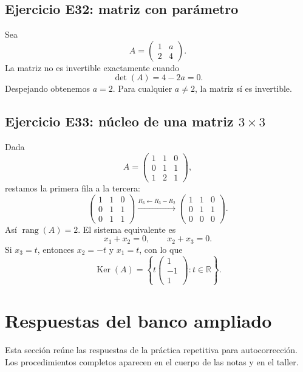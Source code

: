 \documentclass[12pt]{article}
\theoremstyle{remark}
\newcommand{\R}{\mathbb{R}}
\newcommand{\rang}{\operatorname{rang}}
\newcommand{\Ker}{\operatorname{Ker}}
\begin{document}
\subsection*{Ejercicio E32: matriz con parámetro}
Sea
\[
A=\begin{pmatrix}1&a\\2&4\end{pmatrix}.
\]
La matriz no es invertible exactamente cuando
\[
\det(A)=4-2a=0.
\]
Despejando obtenemos $\boxed{a=2}$. Para cualquier $a\ne2$, la matriz sí es invertible.

\subsection*{Ejercicio E33: núcleo de una matriz $3\times3$}
Dada
\[
A=\begin{pmatrix}1&1&0\\0&1&1\\1&2&1\end{pmatrix},
\]
restamos la primera fila a la tercera:
\[
\begin{pmatrix}1&1&0\\0&1&1\\0&1&1\end{pmatrix}
\xrightarrow{R_3\leftarrow R_3-R_2}
\begin{pmatrix}1&1&0\\0&1&1\\0&0&0\end{pmatrix}.
\]
Así $\rang(A)=2$. El sistema equivalente es
\[
x_1+x_2=0,\qquad x_2+x_3=0.
\]
Si $x_3=t$, entonces $x_2=-t$ y $x_1=t$, con lo que
\[
\boxed{\Ker(A)=\left\{t\begin{pmatrix}1\\-1\\1\end{pmatrix}:t\in\R\right\}.}
\]

\section{Respuestas del banco ampliado}\label{app:respuestas}\noindent Esta sección reúne las respuestas de la práctica repetitiva para autocorrección. Los procedimientos completos aparecen en el cuerpo de las notas y en el taller.\par
\end{document}

